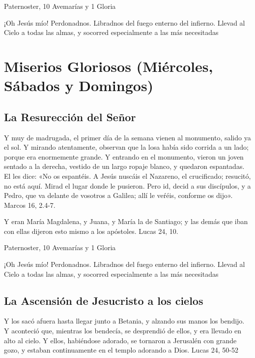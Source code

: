 \documentclass[a4paper,11pt, oneside]{report}
\begin{document}
        \smallskip
         Paternoster, 10 Avemarías y 1 Gloria
        
        \smallskip
        ¡Oh Jesús mío! Perdonadnos. Libradnos del fuego enterno del infierno. Llevad al Cielo a todas las almas, y socorred especialmente a las más 
        necesitadas
        
    \section{Miserios Gloriosos (Miércoles, Sábados y Domingos)}
      \subsection{La Resurección del Señor}
        Y muy de madrugada, el primer día de la semana vienen al monumento, salido ya el sol. Y mirando atentamente, observan que la losa había
        sido corrida a un lado; porque era enormemente grande. Y entrando en el monumento, vieron un joven sentado a la derecha, vestido de un largo
        ropaje blanco, y quedaron espantadas. El les dice: «No os espantéis. A Jesús nuscáis el Nazareno, el crucificado; resucitó, no está aquí. Mirad
        el lugar donde le pusieron. Pero id, decid a sus discípulos, y a Pedro, que va delante de vosotros a Galilea; allí le veŕéis, conforme os dijo».
        Marcos 16, 2.4-7\cite{bover-cantera}.

        \smallskip
        Y eran María Magdalena, y Juana, y María la de Santiago; y las demás que iban con ellas dijeron esto mismo a los apóstoles. 
        Lucas 24, 10\cite{bover-cantera}.

        \smallskip
         Paternoster, 10 Avemarías y 1 Gloria
        
        \smallskip
        ¡Oh Jesús mío! Perdonadnos. Libradnos del fuego enterno del infierno. Llevad al Cielo a todas las almas, y socorred especialmente a las más 
        necesitadas
      
      \subsection{La Ascensión de Jesucristo a los cielos}
        Y los sacó afuera hasta llegar junto a Betania, y alzando sus manos los bendijo. Y aconteció que, mientras los bendecía, se desprendió de ellos,
        y era llevado en alto al cielo. Y ellos, habiéndose adorado, se tornaron a Jerusalén con grande gozo, y estaban continuamente en el templo
        adorando a Dios. Lucas 24, 50-52
\end{document}
